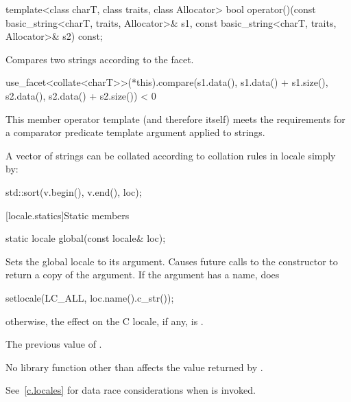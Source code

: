 %
\begin{itemdecl}
template<class charT, class traits, class Allocator>
  bool operator()(const basic_string<charT, traits, Allocator>& s1,
                  const basic_string<charT, traits, Allocator>& s2) const;
\end{itemdecl}

\begin{itemdescr}
\pnum
\effects
Compares two strings according to the  facet.

\pnum
\returns
\begin{codeblock}
use_facet<collate<charT>>(*this).compare(s1.data(), s1.data() + s1.size(),
                                         s2.data(), s2.data() + s2.size()) < 0
\end{codeblock}

\pnum
\remarks
This member operator template (and therefore  itself)
meets the requirements for
a comparator predicate template argument applied to strings.

\pnum
\begin{example}
A vector of strings 
can be collated according to collation rules in locale 
simply by:

\begin{codeblock}
std::sort(v.begin(), v.end(), loc);
\end{codeblock}
\end{example}
\end{itemdescr}

[locale.statics]{Static members}

%
\begin{itemdecl}
static locale global(const locale& loc);
\end{itemdecl}

\begin{itemdescr}
\pnum
\effects
Sets the global locale to its argument.
Causes future calls to the constructor 
to return a copy of the argument.
If the argument has a name, does
\begin{codeblock}
setlocale(LC_ALL, loc.name().c_str());
\end{codeblock}
otherwise, the effect on the C locale, if any, is
.

\pnum
\returns
The previous value of .

\pnum
\remarks
No library function other than 
affects the value returned by .
\begin{note}
See~\ref{c.locales} for data race considerations
when  is invoked.
\end{note}
\end{itemdescr}

